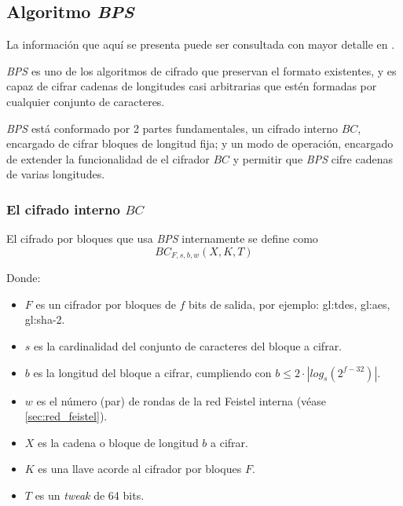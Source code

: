 %
%

\subsection{Algoritmo \textit{BPS}}
\label{sec:bps}

La información que aquí se presenta puede ser consultada con mayor detalle en
\cite{bps}.

\textit{BPS} es uno de los algoritmos de cifrado que preservan el formato
existentes, y es capaz de cifrar cadenas de longitudes casi arbitrarias que
estén formadas por cualquier conjunto de caracteres.

\textit{BPS} está conformado por 2 partes fundamentales, un cifrado interno
$BC$, encargado de cifrar bloques de longitud fija; y un modo de operación,
encargado de extender la funcionalidad de el cifrador $BC$ y permitir que
\textit{BPS} cifre cadenas de varias longitudes.


\subsubsection{El cifrado interno $BC$}


El cifrado por bloques que usa \textit{BPS} internamente se define como
\begin{equation}
  BC_{F,s,b,w}(X,K,T)
\end{equation}

Donde:
\begin{itemize}
  \item $F$ es un cifrador por bloques de $f$ bits de salida,
    por ejemplo: \gls{gl:tdes}, \gls{gl:aes}, \gls{gl:sha}-2.
  \item $s$ es la cardinalidad del conjunto de caracteres del bloque a cifrar.
  \item $b$ es la longitud del bloque a cifrar,
    cumpliendo con $b \leq 2 \cdot |log_s(2^{f-32})|$.
  \item $w$ es el número (par) de rondas de la red Feistel interna
    (véase \ref{sec:red_feistel}).
  \item $X$ es la cadena o bloque de longitud $b$ a cifrar.
  \item $K$ es una llave acorde al cifrador por bloques $F$.
  \item $T$ es un \textit{tweak} de 64 bits.
\end{itemize}

